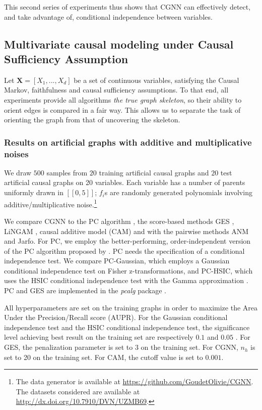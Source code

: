 \documentclass[a4paper, 11pt]{article}
\begin{document}
This second series of experiments thus shows that CGNN can effectively detect, and take advantage of, conditional independence between variables. 

\subsection{Multivariate causal modeling under Causal Sufficiency Assumption \label{LearningCausalMarkov}}\label{sec:multi}

Let ${\mathbf X} = [X_1,...,X_d]$ be a set of continuous variables, satisfying the Causal Markov, faithfulness and causal sufficiency assumptions. To that end, all experiments provide all algorithms {\em the true graph skeleton}, so their ability to orient edges is compared in a fair way. This allows us to separate the task of orienting the graph from that of uncovering the skeleton.


\subsubsection{Results on artificial graphs with additive and multiplicative noises} 

We draw $500$ samples from $20$ training artificial causal graphs and $20$ test artificial causal graphs on 20 variables. Each variable has a number of parents uniformly drawn in $[[0,5]]$; $f_i$s are randomly generated polynomials involving additive/multiplicative noise.\footnote{The data generator is available at \url{https://github.com/GoudetOlivie/CGNN}. The datasets considered are available at \url{http://dx.doi.org/10.7910/DVN/UZMB69}.}

We compare CGNN to the PC algorithm \cite{spirtes1993search}, the score-based methods GES \cite{chickering2002optimal}, LiNGAM  \cite{shimizu2006linear}, causal additive model (CAM) \cite{buhlmann2014cam}
and with the pairwise methods ANM and Jarfo. For PC, we employ the better-performing, order-independent version of the PC algorithm proposed by \cite{colombo2014order}. PC needs the specification of a conditional independence test. We compare PC-Gaussian, which
employs a Gaussian conditional independence test on Fisher z-transformations,
and PC-HSIC, which uses the HSIC conditional independence test with the Gamma approximation \cite{gretton2005kernel}. PC and GES are implemented in the \textit{pcalg} package \cite{kalisch2012causal}.

All hyperparameters are set on the training graphs in order to maximize the Area Under the Precision/Recall score (AUPR). For the Gaussian conditional independence test and the HSIC conditional independence test, the significance level achieving best result on the training set are respectively $0.1$ and $0.05$ .  For GES, the penalization parameter is set to $3$ on the training set.  For CGNN, $n_h$ is set to 20 on the training set. For CAM, the cutoff value is set to $0.001$.
\end{document}
